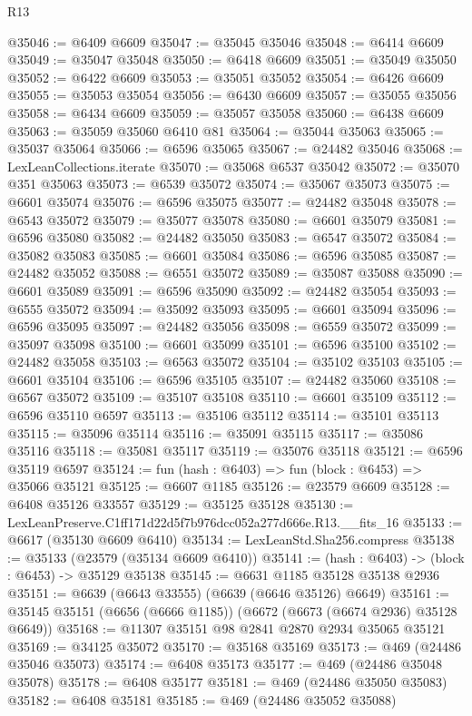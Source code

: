 \begin{lexlean}{R13}
\begin{coremodule}
@35046 := @6409 @6609
@35047 := @35045 @35046
@35048 := @6414 @6609
@35049 := @35047 @35048
@35050 := @6418 @6609
@35051 := @35049 @35050
@35052 := @6422 @6609
@35053 := @35051 @35052
@35054 := @6426 @6609
@35055 := @35053 @35054
@35056 := @6430 @6609
@35057 := @35055 @35056
@35058 := @6434 @6609
@35059 := @35057 @35058
@35060 := @6438 @6609
@35063 := @35059 @35060 @6410 @81
@35064 := @35044 @35063
@35065 := @35037 @35064
@35066 := @6596 @35065
@35067 := @24482 @35046
@35068 := LexLeanCollections.iterate
@35070 := @35068 @6537 @35042
@35072 := @35070 @351 @35063
@35073 := @6539 @35072
@35074 := @35067 @35073
@35075 := @6601 @35074
@35076 := @6596 @35075
@35077 := @24482 @35048
@35078 := @6543 @35072
@35079 := @35077 @35078
@35080 := @6601 @35079
@35081 := @6596 @35080
@35082 := @24482 @35050
@35083 := @6547 @35072
@35084 := @35082 @35083
@35085 := @6601 @35084
@35086 := @6596 @35085
@35087 := @24482 @35052
@35088 := @6551 @35072
@35089 := @35087 @35088
@35090 := @6601 @35089
@35091 := @6596 @35090
@35092 := @24482 @35054
@35093 := @6555 @35072
@35094 := @35092 @35093
@35095 := @6601 @35094
@35096 := @6596 @35095
@35097 := @24482 @35056
@35098 := @6559 @35072
@35099 := @35097 @35098
@35100 := @6601 @35099
@35101 := @6596 @35100
@35102 := @24482 @35058
@35103 := @6563 @35072
@35104 := @35102 @35103
@35105 := @6601 @35104
@35106 := @6596 @35105
@35107 := @24482 @35060
@35108 := @6567 @35072
@35109 := @35107 @35108
@35110 := @6601 @35109
@35112 := @6596 @35110 @6597
@35113 := @35106 @35112
@35114 := @35101 @35113
@35115 := @35096 @35114
@35116 := @35091 @35115
@35117 := @35086 @35116
@35118 := @35081 @35117
@35119 := @35076 @35118
@35121 := @6596 @35119 @6597
@35124 := fun (hash : @6403) => fun (block : @6453) => @35066 @35121
@35125 := @6607 @1185
@35126 := @23579 @6609
@35128 := @6408 @35126 @33557
@35129 := @35125 @35128
@35130 := LexLeanPreserve.C1ff171d22d5f7b976dcc052a277d666e.R13.__fits_16
@35133 := @6617 (@35130 @6609 @6410)
@35134 := LexLeanStd.Sha256.compress
@35138 := @35133 (@23579 (@35134 @6609 @6410))
@35141 := (hash : @6403) -> (block : @6453) -> @35129 @35138
@35145 := @6631 @1185 @35128 @35138 @2936
@35151 := @6639 (@6643 @33555) (@6639 (@6646 @35126) @6649)
@35161 := @35145 @35151 (@6656 (@6666 @1185)) (@6672 (@6673 (@6674 @2936) @35128 @6649))
@35168 := @11307 @35151 @98 @2841 @2870 @2934 @35065 @35121
@35169 := @34125 @35072
@35170 := @35168 @35169
@35173 := @469 (@24486 @35046 @35073)
@35174 := @6408 @35173
@35177 := @469 (@24486 @35048 @35078)
@35178 := @6408 @35177
@35181 := @469 (@24486 @35050 @35083)
@35182 := @6408 @35181
@35185 := @469 (@24486 @35052 @35088)

\end{coremodule}
\end{lexlean}
